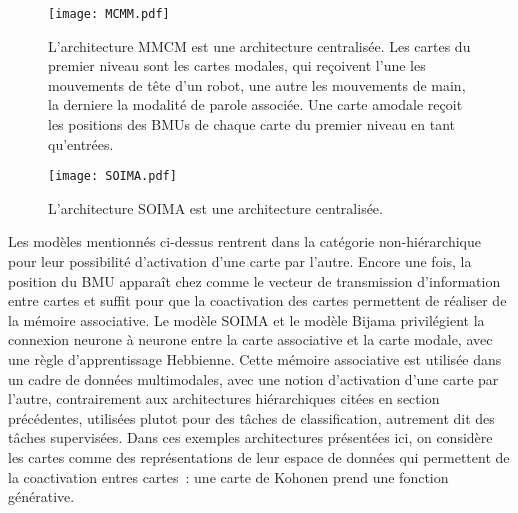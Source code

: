 \documentclass[../main]{subfiles}
\begin{document}

\begin{figure}
    \centering
    \texttt{[image: MCMM.pdf]}
    \caption{L'architecture MMCM \cite{dominey13} est une architecture centralisée.
    Les cartes du premier niveau sont les cartes modales, qui reçoivent l'une les mouvements de tête d'un robot, une autre les mouvements de main, la derniere la modalité de parole associée.
    Une carte amodale reçoit les positions des BMUs de chaque carte du premier niveau en tant qu'entrées. 
    \label{fig:mmcm}}
\end{figure}

\begin{figure}
    \centering
    \texttt{[image: SOIMA.pdf]}
    \caption{L'architecture SOIMA \cite{escobar-juarez_self-organized_2016} est une architecture centralisée.
    \label{fig:SOIMA}}
\end{figure}

Les modèles mentionnés ci-dessus rentrent dans la catégorie non-hiérarchique pour leur possibilité d'activation d'une carte par l'autre. Encore une fois, la position du BMU apparaît chez \cite{dominey13} comme le vecteur de transmission d'information  entre cartes et suffit pour que la coactivation des cartes permettent de réaliser de la mémoire associative. Le modèle SOIMA et le modèle Bijama privilégient la connexion neurone à neurone entre la carte associative et la carte modale, avec une règle d'apprentissage Hebbienne.
Cette mémoire associative est utilisée dans un cadre de données multimodales, avec une notion d'activation d'une carte par l'autre, contrairement aux architectures hiérarchiques citées en section précédentes, utilisées plutot pour des tâches de classification, autrement dit des tâches supervisées.
Dans ces exemples architectures présentées ici, on considère les cartes comme des représentations de leur espace de données qui permettent de la coactivation entres cartes~: une carte de Kohonen prend une fonction générative.
\end{document}
